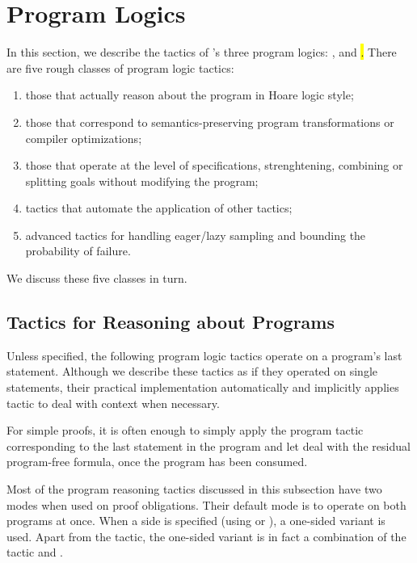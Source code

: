 \section{Program Logics}
\label{sec:programlogics}

In this section, we describe the tactics of \EasyCrypt's three program
logics: \prhl, \phl and \hl.  There are five rough classes of program
logic tactics:
\begin{enumerate}
\item those that actually reason about the program in Hoare logic
  style;

\item those that correspond to semantics-preserving program
  transformations or compiler optimizations;

\item those that operate at the level of specifications,
  strenghtening, combining or splitting goals without modifying the
  program;

\item tactics that automate the application of other tactics;

\item advanced tactics for handling eager/lazy sampling and bounding
  the probability of failure.
\end{enumerate}
We discuss these five classes in turn.

\subsection{Tactics for Reasoning about Programs}
\label{subsec:reasoningprograms}

Unless specified, the following program logic tactics operate on a
program's last statement. Although we describe these tactics as if
they operated on single statements, their practical implementation
automatically and implicitly applies tactic  to deal with
context when necessary.

For simple proofs, it is often enough to simply apply the program
tactic corresponding to the last statement in the program and let
 deal with the residual program-free formula, once the program
has been consumed.

Most of the program reasoning tactics discussed in this subsection
have two modes when used on \prhl proof obligations. Their default
mode is to operate on both programs at once. When a side is specified
(using  or ), a one-sided variant
is used. Apart from the  tactic, the one-sided variant is
in fact a combination of the \phl tactic and .

